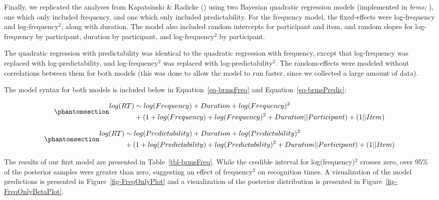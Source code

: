 \documentclass[
  12pt,
  letterpaper,
]{scrreprt}
\begin{document}
Finally, we replicated the analyses from Kapatsinski \& Radicke
() using
two Bayesian quadratic regression models (implemented in \emph{brms;}
), one which
only included frequency, and one which only included predictability. For
the frequency model, the fixed-effects were log-frequency and
log-frequency\(^2\), along with duration. The model also included random
intercepts for participant and item, and random slopes for log-frequency
by participant, duration by participant, and log-frequency\(^2\) by
participant.

The quadratic regression with predictability was identical to the
quadratic regression with frequency, except that log-frequency was
replaced with log-predictability, and log-frequency\(^2\) was replaced
with log-predictability\(^2\). The random-effects were modeled without
correlations between them for both models (this was done to allow the
model to run faster, since we collected a large amount of data).

The model syntax for both models is included below in
Equation~\ref{eq-brmsFreq} and Equation~\ref{eq-brmsPredic}:

\begin{equation}\phantomsection\label{eq-brmsFreq}{
\begin{aligned}
log(RT) & \sim log(Frequency) + Duration + log(Frequency)^2 \\ & + (1 + log(Frequency) + log(Frequency)^2 + Duration || Participant) + (1 || Item)
\end{aligned}
}\end{equation}

\begin{equation}\phantomsection\label{eq-brmsPredic}{
\begin{aligned}
log(RT) & \sim log(Predictability) + Duration + log(Predictability)^2 \\ & + (1 + log(Predictability) + log(Predictability)^2 + Duration || Participant) + (1 || Item)
\end{aligned}
}\end{equation}

The results of our first model are presented in
Table~\ref{tbl-brmsFreq}. While the credible interval for
log(frequency)\(^2\) crosses zero, over 95\% of the posterior samples
were greater than zero, suggesting an effect of frequency\(^2\) on
recognition times. A visualization of the model predictions is presented
in Figure~\ref{fig-FreqOnlyPlot} and a visualization of the posterior
distribution is presented in Figure~\ref{fig-FreqOnlyBetaPlot}.
\end{document}
